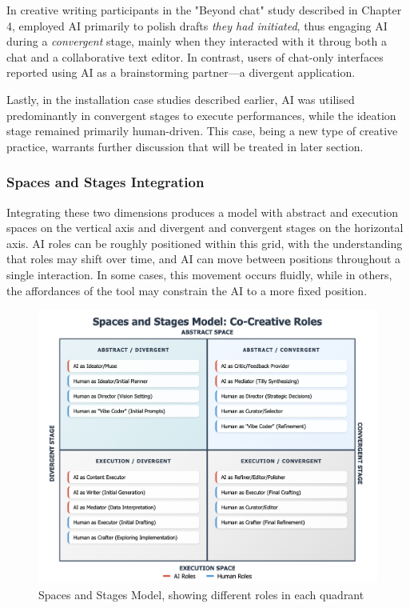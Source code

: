 In creative writing participants in the "Beyond chat" study described in Chapter 4, employed AI primarily to polish drafts \textit{they had initiated}, thus engaging AI during a \textit{convergent} stage, mainly when they interacted with it throug both a chat and a collaborative text editor. In contrast, users of chat-only interfaces reported using AI as a brainstorming partner—a divergent application. 

Lastly, in the installation case studies described earlier, AI was utilised predominantly in convergent stages to execute performances, while the ideation stage remained primarily human-driven. This case, being a new type of creative practice, warrants further discussion that will be treated in later section.

\subsubsection{Spaces and Stages Integration}

Integrating these two dimensions produces a model with abstract and execution spaces on the vertical axis and divergent and convergent stages on the horizontal axis. AI roles can be roughly positioned within this grid, with the understanding that roles may shift over time, and AI can move between positions throughout a single interaction. In some cases, this movement occurs fluidly, while in others, the affordances of the tool may constrain the AI to a more fixed position.

\begin{figure}
    \centering
    \includegraphics[width=1\linewidth]{spacesandstages.png}
    \caption{Spaces and Stages Model, showing different roles in each quadrant}
    \label{fig:enter-label}
\end{figure}

